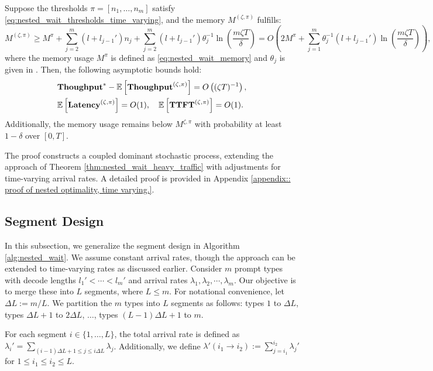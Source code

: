 \begin{theorem}
\label{thm:nested_wait_heavy_traffic_time_varying}
Suppose the thresholds $\pi = [n_1, \dots, n_m]$ satisfy \eqref{eq:nested_wait_thresholds_time_varying}, and the memory $M^{(\zeta,\pi)}$ fulfills:
\[
M^{(\zeta,\pi)} \geq M^{\pi} + \sum_{j=2}^m (l + l_{j-1}') n_j + \sum_{j=2}^m (l + l_{j-1}') \theta_j^{-1} \ln\left( \frac{m \zeta T}{\delta} \right) = O\left( 2M^\pi + \sum_{j=1}^m \theta_j^{-1} (l + l_{j-1}') \ln\left( \frac{m \zeta T}{\delta} \right) \right),
\]
where the memory usage $M^\pi$ is defined as \eqref{eq:nested_wait_memory} and $\theta_j$ is given in . %
Then, the following asymptotic bounds hold:
\begin{align*}
&\textbf{Thoughput}^* - \mathbb{E}\left[ \textbf{Thoughput}^{(\zeta, \pi)} \right] = O\left( (\zeta T)^{-1} \right), \\
&\mathbb{E}\left[ \textbf{Latency}^{(\zeta, \pi)} \right] = O(1), \quad \mathbb{E}\left[ \textbf{TTFT}^{(\zeta, \pi)} \right] = O(1).
\end{align*}
Additionally, the memory usage remains below $M^{\zeta,\pi}$ with probability at least $1 - \delta$ over $[0, T]$.
\end{theorem}

The proof constructs a coupled dominant stochastic process, extending the approach of Theorem \ref{thm:nested_wait_heavy_traffic} with adjustments for time-varying arrival rates. A detailed proof is provided in Appendix \ref{appendix:: proof of nested optimality, time varying.}.

\subsection{Segment Design}

In this subsection, we generalize the segment design in Algorithm \ref{alg:nested_wait}. We assume constant arrival rates, though the approach can be extended to time-varying rates as discussed earlier. Consider $m$ prompt types with decode lengths $l_1' < \cdots < l_m'$ and arrival rates $\lambda_1, \lambda_2, \cdots, \lambda_m$. Our objective is to merge these into $L$ segments, where $L \leq m$. For notational convenience, let $\Delta L:= m/L$. We partition the $m$ types into $L$ segments as follows: types $1$ to $\Delta L$, types $\Delta L+ 1$ to $2\Delta L$, $\dots$, types $(L-1)\Delta L+ 1$ to $m$.

For each segment $i \in \{1, \dots, L\}$, the total arrival rate is defined as $\lambda_i' = \sum_{(i-1)\Delta L+1\le j\le i\Delta L} \lambda_j$. Additionally, we define $\lambda'(i_1 \to i_2) := \sum_{j=i_1}^{i_2} \lambda_j'$ for $1 \leq i_1 \leq i_2 \leq L$.

